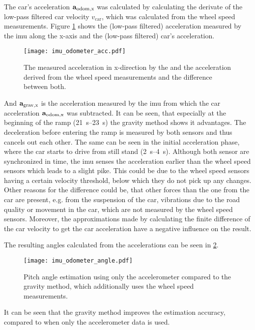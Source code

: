 The car's acceleration $\vb{a}_\mathrm{odom,x} $ was calculated by calculating the derivate of the low-pass filtered car velocity $v_\mathrm{car} $, which was calculated from the wheel speed measurements.
Figure \ref{fig:imu_odometer_acc} shows the (low-pass filtered) acceleration measured by the \gls{imu} along the x-axis and the (low-pass filtered) car's acceleration.
\begin{figure}[htb]
	\centering
	\texttt{[image: imu\_odometer\_acc.pdf]}
	\caption[Measured acceleration from  and odometer]{The measured acceleration in x-direction by the  and the acceleration derived from the wheel speed measurements and the difference between both.}
	\label{fig:imu_odometer_acc}
\end{figure}
And $\vb{a}_\mathrm{grav,x} $ is the acceleration measured by the \gls{imu} from which the car acceleration $\vb{a}_\mathrm{odom,x} $ was subtracted.
It can be seen, that especially at the beginning of the ramp (\SIrange{21}{23}{\second}) the gravity method shows it advantages.
The deceleration before entering the ramp is measured by both sensors and thus cancels out each other.
The same can be seen in the initial acceleration phase, where the car starts to drive from still stand (\SIrange[]{2}{4}{\second}).
Although both sensor are synchronized in time, the \gls{imu} senses the acceleration earlier than the wheel speed sensors which leads to a slight pike.
This could be due to the wheel speed sensors having a certain velocity threshold, below which they do not pick up any changes.
Other reasons for the difference could be, that other forces than the one from the car are present, e.g. from the suspension of the car, vibrations due to the road quality or movement in the car, which are not measured by the wheel speed sensors.
Moreover, the approximations made by calculating the finite difference of the car velocity to get the car acceleration have a negative influence on the result.\par
The resulting angles calculated from the accelerations can be seen in \cref{fig:imu_odometer_angle}.
\begin{figure}[htb]
	\centering
	\texttt{[image: imu\_odometer\_angle.pdf]}
	\caption[Angle estimation using the gravity method]{Pitch angle estimation using only the accelerometer compared to the gravity method, which additionally uses the wheel speed measurements.}
	\label{fig:imu_odometer_angle}
\end{figure}
It can be seen that the gravity method improves the estimation accuracy, compared to when only the accelerometer data is used.
